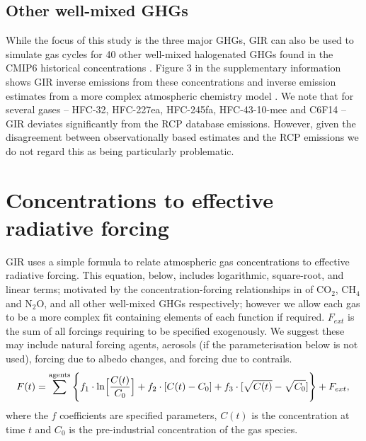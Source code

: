 \documentclass[gmd, manuscript]{copernicus}
\begin{document}
\subsection*{Other well-mixed GHGs}
While the focus of this study is the three major GHGs, GIR can also be used to simulate gas cycles for 40 other well-mixed halogenated GHGs found in the CMIP6 historical concentrations \citep{Meinshausen2017}. Figure 3 in the supplementary information shows GIR inverse emissions from these concentrations and inverse emission estimates from a more complex atmospheric chemistry model \citep{Cunnold1994,Rigby2011,Rigby2014,Engel2018,Prinn2018}. We note that for several gases -- HFC-32, HFC-227ea, HFC-245fa, HFC-43-10-mee and C6F14 -- GIR deviates significantly from the RCP database emissions. However, given the disagreement between observationally based estimates \citep{Vollmer2011,Ivy2012,Odoherty2014} and the RCP emissions we do not regard this as being particularly problematic.

\section{Concentrations to effective radiative forcing}
GIR uses a simple formula to relate atmospheric gas concentrations to effective radiative forcing. This equation, below, includes logarithmic, square-root, and linear terms; motivated by the concentration-forcing relationships in \cite{Myhre2013a} of CO$_2$, CH$_4$ and N$_2$O, and all other well-mixed GHGs respectively; however we allow each gas to be a more complex fit containing elements of each function if required. $F_{ext}$ is the sum of all forcings requiring to be specified exogenously. We suggest these may include natural forcing agents, aerosols (if the parameterisation below is not used), forcing due to albedo changes, and forcing due to contrails.
\begin{equation}
    F(t) = \sum^{\text{agents}} \Bigg\{ f_1 \cdot \text{ln}\Big[\frac{C(t)}{C_0}\Big] + f_2 \cdot [C(t) - C_0] + f_3 \cdot[\sqrt{C(t)} - \sqrt{C_0}] \Bigg\} + F_{ext}, \label{eq_forc}\\
\end{equation}
where the $f$ coefficients are specified parameters, $C(t)$ is the concentration at time $t$ and $C_0$ is the pre-industrial concentration of the gas species.
\end{document}
